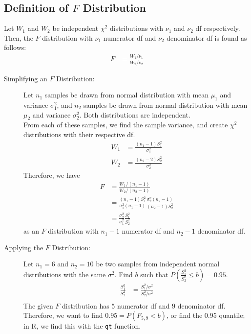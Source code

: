 \documentclass[10pt]{extarticle}
\begin{document}
\subsection{Definition of $F$ Distribution}%
  Let $W_1$ and $W_2$ be independent $\chi^2$ distributions with $\nu_1$ and $\nu_2$ df respectively. Then, the $F$ distribution with $\nu_1$ numerator df and $\nu_2$ denominator df is found as follows:
  \begin{align*}
    F &= \frac{W_1/\nu_1}{W_2/\nu_2}
  \end{align*}
  \begin{description}
    \item[Simplifying an $F$ Distribution:] Let $n_1$ samples be drawn from normal distribution with mean $\mu_1$ and variance $\sigma_1^2$, and $n_2$ samples be drawn from normal distribution with mean $\mu_2$ and variance $\sigma_2^2$. Both distributions are independent.\\

      From each of these samples, we find the sample variance, and create $\chi^2$ distributions with their respective df.
      \begin{align*}
        W_1 &= \frac{(n_1-1)S_1^2}{\sigma_1^2}\\
        W_2 &= \frac{(n_2-2)S_2^2}{\sigma_2^2}
      \end{align*}
      Therefore, we have
      \begin{align*}
        F &= \frac{W_1/(n_1-1)}{W_2/(n_2-1)}\\
          &= \frac{(n_1-1)S_1^2}{\sigma_1^2(n_1-1)} \frac{\sigma_2^2(n_2-1)}{(n_2-1)S_2^2}\\
          &= \frac{\sigma_2^2}{\sigma_1^2}\frac{S_1^2}{S_2^2}
      \end{align*}
      as an $F$ distribution with $n_1-1$ numerator df and $n_2-1$ denominator df.
    \item[Applying the $F$ Distribution:] Let $n_1=6$ and $n_2=10$ be two samples from independent normal distributions with the same $\sigma^2$. Find $b$ such that $P \left(\frac{S_1^2}{S_2^2} \leq b\right) = 0.95$.
      \begin{align*}
        \frac{S_1^2}{S_2^2} &= \frac{S_1^2/\sigma^2}{S_2^2/\sigma^2}\\
      \end{align*}
      The given $F$ distribution has $5$ numerator df and $9$ denominator df. Therefore, we want to find $0.95 = P(F_{5,9} < b)$, or find the $0.95$ quantile; in R, we find this with the \texttt{qt} function.
  \end{description}
\end{document}
